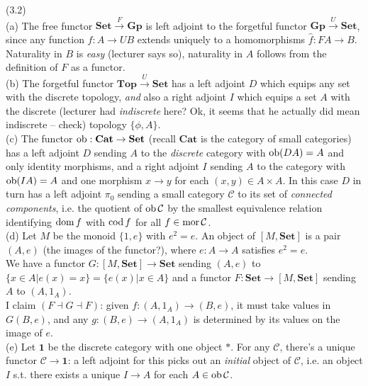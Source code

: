 \documentclass[a4paper]{article}
\begin{document}
\begin{eg} (3.2)\\
    (a) The free functor $\mathbf{Set} \xrightarrow{F} \mathbf{Gp}$ is left adjoint to the forgetful functor $\mathbf{Gp} \xrightarrow{U} \mathbf{Set}$, since any function $f:A \to UB$ extends uniquely to a homomorphisms $\hat{f}: FA \to B$.\\
    Naturality in $B$ is \emph{easy} (lecturer says so), naturality in $A$ follows from the definition of $F$ as a functor.\\
    (b) The forgetful functor $\mathbf{Top} \xrightarrow{U} \mathbf{Set}$ has a left adjoint $D$ which equips any set with the discrete topology, \emph{and} also a right adjoint $I$ which equips a set $A$ with the discrete (lecturer had \emph{indiscrete} here? Ok, it seems that he actually did mean indiscrete -- check) topology $\{\phi,A\}$.\\
    (c) The functor $\operatorname{ob}: \mathbf{Cat} \to \mathbf{Set}$ (recall $\mathbf{Cat}$ is the category of small categories) has a left adjoint $D$ sending $A$ to the \emph{discrete} category with $\operatorname{ob}(DA) = A$ and only identity morphisms, and a right adjoint $I$ sending $A$ to the category with $\operatorname{ob}(IA) = A$ and one morphism $x \to y$ for each $(x,y) \in A \times A$. In this case $D$ in turn has a left adjoint $\pi_0$ sending a small category $\mathcal{C}$ to its set of \emph{connected components}, i.e. the quotient of $\operatorname{ob}\mathcal{C}$ by the smallest equivalence relation identifying $\operatorname{dom} f$ with $\operatorname{cod} f$ for all $f \in \operatorname{mor} \mathcal{C}$.\\
    (d) Let $M$ be the monoid $\{1,e\}$ with $e^2=e$. An object of $[M,\mathbf{Set}]$ is a pair $(A,e)$ (the images of the functor?), where $e:A \to A$ satisfies $e^2=e$.\\
    We have a functor $G:[M,\mathbf{Set}] \to \mathbf{Set}$ sending $(A,e)$ to $\{x \in A | e(x) = x \} = \{e(x) | x \in A\}$ and a functor $F: \mathbf{Set} \to [M,\mathbf{Set}]$ sending $A$ to $(A,1_A)$.\\
    I claim $(F \dashv G \dashv F)$: given $f:(A,1_A) \to (B,e)$, it must take values in $G(B,e)$, and any $g:(B,e) \to (A,1_A)$ is determined by its values on the image of $e$.\\
    (e) Let $\mathbf{1}$ be the discrete category with one object $*$. For any $\mathcal{C}$, there's a unique functor $\mathcal{C} \to \mathbf{1}$: a left adjoint for this picks out an \emph{initial} object of $\mathcal{C}$, i.e. an object $I$ s.t. there exists a unique $I \to A$ for each $A \in \operatorname{ob} \mathcal{C}$.\\

\end{eg}
\end{document}
